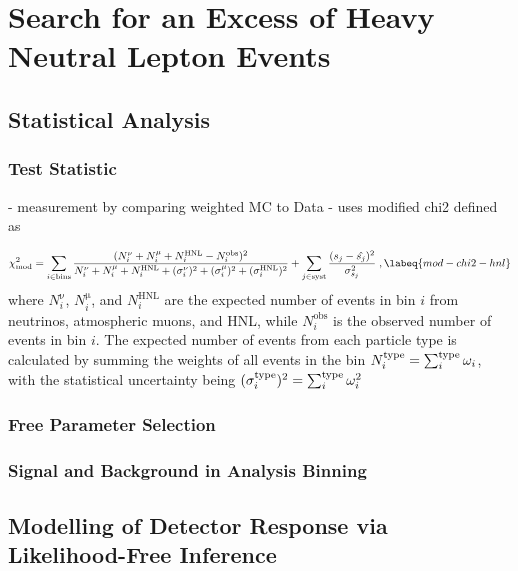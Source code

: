 \setchapterpreamble[u]{\margintoc}

\chapter{Search for an Excess of Heavy Neutral Lepton Events}


\section{Statistical Analysis} 

\subsection{Test Statistic}

- measurement by comparing weighted MC to Data
- uses modified chi2 defined as


\begin{equation}
    \chi^2_{\mathrm{mod}} = 
    \sum_{i \in \mathrm{bins}}^{}\frac{(N^{\mathrm{\nu}}_i + N^{\mathrm{\mu}}_i + N^{\mathrm{HNL}}_i - N^{\mathrm{obs}}_i)^2}
    {N^{\mathrm{\nu}}_i + N^{\mathrm{\mu}}_i + N^{\mathrm{HNL}}_i + (\sigma^{\mathrm{\nu}}_i)^2 + (\sigma^{\mathrm{\mu}}_i)^2 + (\sigma^{\mathrm{HNL}}_i)^2}
     + \sum_{j \in \mathrm{syst}}^{}\frac{(s_j - \hat{s_j})^2}{\sigma^2_{s_j}}
    \;,
    \labeq{mod-chi2-hnl}
\end{equation}
where $N^{\mathrm{\nu}}_i$, $N^{\mathrm{\mu}}_i$, and $N^{\mathrm{HNL}}_i$ are the expected number of events in bin $i$ from neutrinos, atmospheric muons, and HNL, while $N^{\mathrm{obs}}_i$ is the observed number of events in bin $i$. The expected number of events from each particle type is calculated by summing the weights of all events in the bin $N^{\mathrm{type}}_i = \sum_i^{\rm type}\omega_i$, with the statistical uncertainty being $(\sigma^{\mathrm{type}}_i)^2 = \sum_i^{\rm type}\omega_i^2$ 


\subsection{Free Parameter Selection}

\subsection{Signal and Background in Analysis Binning}


\section{Modelling of Detector Response via Likelihood-Free Inference}



